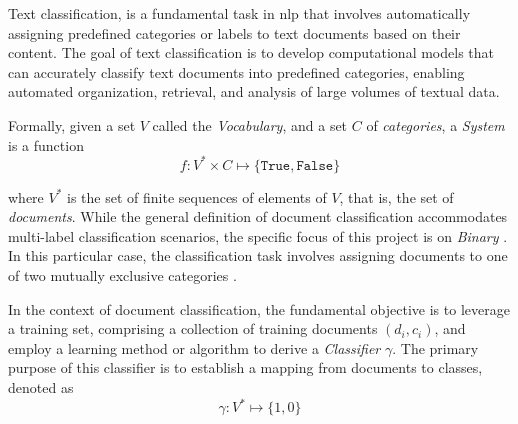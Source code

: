 \label{02_text_classification}

Text classification, is a fundamental task in \gls{nlp} that involves automatically assigning predefined categories or labels to text documents based on their content. The goal of text classification is to develop computational models that can accurately classify text documents into predefined categories, enabling automated organization, retrieval, and analysis of large volumes of textual data.

Formally, given a set $V$ called the \emph{Vocabulary}, and a set $C$ of \emph{categories}, a \emph{\textclassification{} System} is a function 
$$f: V^*\times C \mapsto \{ \texttt{True}, \texttt{False} \}$$

where $V^*$ is the set of finite sequences of elements of $V$, that is, the set of \emph{documents}. 
While the general definition of document classification accommodates multi-label classification scenarios, the specific focus of this project is on \emph{Binary \textclassification{}}. In this particular case, the classification task involves assigning documents to one of two mutually exclusive categories .

In the context of document classification, the fundamental objective is to leverage a training set, comprising a collection of training documents $(d_i, c_i)$, and employ a learning method or algorithm to derive a \emph{Classifier} $\gamma$. The primary purpose of this classifier is to establish a mapping from documents to classes, denoted as 
$$\gamma : V^* \mapsto \{1, 0\}$$
